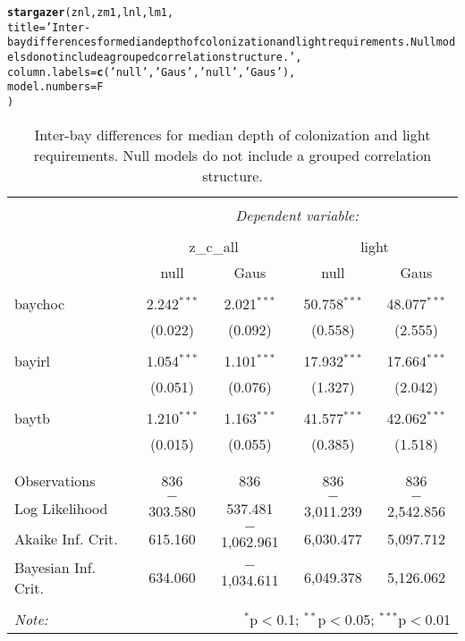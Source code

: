 \documentclass{article}\usepackage[]{graphicx}\usepackage[]{color}
\makeatletter
\newcommand{\hlstr}[1]{\textcolor[rgb]{0.192,0.494,0.8}{#1}}%
\newcommand{\hlstd}[1]{\textcolor[rgb]{0.345,0.345,0.345}{#1}}%
\newcommand{\hlkwc}[1]{\textcolor[rgb]{0.333,0.667,0.333}{#1}}%
\newcommand{\hlkwd}[1]{\textcolor[rgb]{0.737,0.353,0.396}{\textbf{#1}}}%
\newenvironment{kframe}{%
 \def\at@end@of@kframe{}%
 \ifinner\ifhmode%
  \def\at@end@of@kframe{\end{minipage}}%
  \begin{minipage}{\columnwidth}%
 \fi\fi%
 \def\FrameCommand##1{\hskip\@totalleftmargin \hskip-\fboxsep
 \colorbox{shadecolor}{##1}\hskip-\fboxsep
     \hskip-\linewidth \hskip-\@totalleftmargin \hskip\columnwidth}%
 \MakeFramed {\advance\hsize-\width
   \@totalleftmargin\z@ \linewidth\hsize
   \@setminipage}}%
 {\par\unskip\endMakeFramed%
 \at@end@of@kframe}
\makeatother
\begin{document}
\begin{kframe}
\begin{alltt}
\hlkwd{stargazer}\hlstd{(znl, zm1, lnl, lm1,}
  \hlkwc{title} \hlstd{=} \hlstr{'Inter-bay differences for median depth of colonization and light requirements. Null models do not include a grouped correlation structure.'}\hlstd{,}
  \hlkwc{column.labels} \hlstd{=} \hlkwd{c}\hlstd{(}\hlstr{'null'}\hlstd{,} \hlstr{'Gaus'}\hlstd{,} \hlstr{'null'}\hlstd{,} \hlstr{'Gaus'}\hlstd{),}
  \hlkwc{model.numbers} \hlstd{= F}
  \hlstd{)}
\end{alltt}
\end{kframe}
\begin{table}[!htbp] \centering 
  \caption{Inter-bay differences for median depth of colonization and light requirements. Null models do not include a grouped correlation structure.} 
  \label{} 
\begin{tabular}{@{\extracolsep{5pt}}lcccc} 
\\[-1.8ex]\hline 
\hline \\[-1.8ex] 
 & \multicolumn{4}{c}{\textit{Dependent variable:}} \\ 
\cline{2-5} 
\\[-1.8ex] & \multicolumn{2}{c}{z\_c\_all} & \multicolumn{2}{c}{light} \\ 
 & null & Gaus & null & Gaus \\ 
\hline \\[-1.8ex] 
 baychoc & 2.242$^{***}$ & 2.021$^{***}$ & 50.758$^{***}$ & 48.077$^{***}$ \\ 
  & (0.022) & (0.092) & (0.558) & (2.555) \\ 
  & & & & \\ 
 bayirl & 1.054$^{***}$ & 1.101$^{***}$ & 17.932$^{***}$ & 17.664$^{***}$ \\ 
  & (0.051) & (0.076) & (1.327) & (2.042) \\ 
  & & & & \\ 
 baytb & 1.210$^{***}$ & 1.163$^{***}$ & 41.577$^{***}$ & 42.062$^{***}$ \\ 
  & (0.015) & (0.055) & (0.385) & (1.518) \\ 
  & & & & \\ 
\hline \\[-1.8ex] 
Observations & 836 & 836 & 836 & 836 \\ 
Log Likelihood & $-$303.580 & 537.481 & $-$3,011.239 & $-$2,542.856 \\ 
Akaike Inf. Crit. & 615.160 & $-$1,062.961 & 6,030.477 & 5,097.712 \\ 
Bayesian Inf. Crit. & 634.060 & $-$1,034.611 & 6,049.378 & 5,126.062 \\ 
\hline 
\hline \\[-1.8ex] 
\textit{Note:}  & \multicolumn{4}{r}{$^{*}$p$<$0.1; $^{**}$p$<$0.05; $^{***}$p$<$0.01} \\ 
\end{tabular} 
\end{table} 
\end{document}
